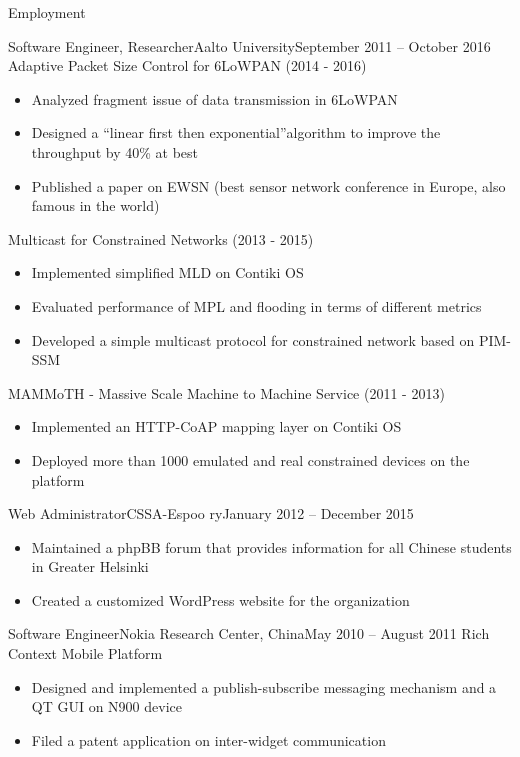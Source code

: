 \documentclass[]{mcdowellcv}
\begin{document}
	\makeheader
	
	\begin{cvsection}{Employment}
		\begin{cvsubsection}{Software Engineer, Researcher}{Aalto University}{September 2011 -- October 2016}
			Adaptive Packet Size Control for 6LoWPAN (2014 - 2016)
			\begin{itemize}
				\item Analyzed fragment issue of data transmission in 6LoWPAN
				\item Designed a \textquotedblleft linear first then exponential\textquotedblright \space algorithm to improve the throughput by 40\% at best
				\item Published a paper on EWSN (best sensor network conference in Europe, also famous in the world)
			\end{itemize}
			Multicast for Constrained Networks (2013 - 2015)
			\begin{itemize}
				\item Implemented simplified MLD on Contiki OS
				\item Evaluated performance of MPL and flooding in terms of different metrics
				\item Developed a simple multicast protocol for constrained network based on PIM-SSM
			\end{itemize}
			MAMMoTH - Massive Scale Machine to Machine Service (2011 - 2013)
			\begin{itemize}
				\item Implemented an HTTP-CoAP mapping layer on Contiki OS
				\item Deployed more than 1000 emulated and real constrained devices on the platform
			\end{itemize}
		\end{cvsubsection}
		
		\begin{cvsubsection}{Web Administrator}{CSSA-Espoo ry}{January 2012 -- December 2015}
			\begin{itemize}
				\item Maintained a phpBB forum that provides information for all Chinese students in Greater Helsinki
				\item Created a customized WordPress website for the organization
			\end{itemize}
		\end{cvsubsection}

		\begin{cvsubsection}{Software Engineer}{Nokia Research Center, China}{May 2010 -- August 2011}
			Rich Context Mobile Platform			
			\begin{itemize}
				\item Designed and implemented a publish-subscribe messaging mechanism and a QT GUI on N900 device
				\item Filed a patent application on inter-widget communication
			\end{itemize}
		\end{cvsubsection}


\end{cvsection}
\end{document}
